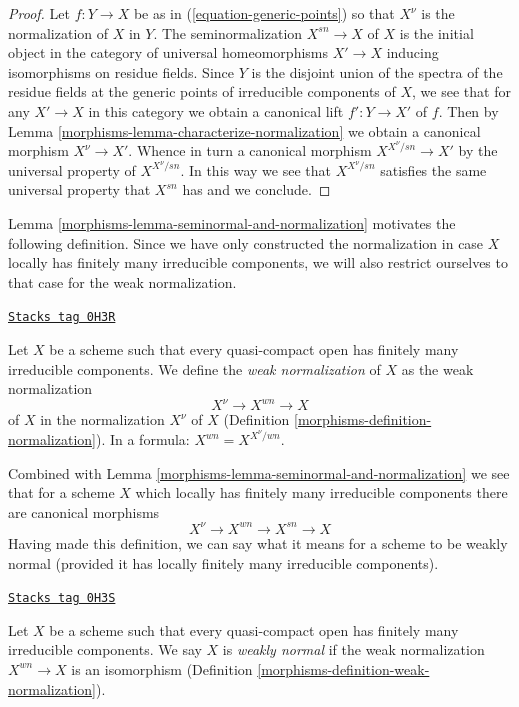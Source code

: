 \begin{proof}

Let $f : Y \to X$ be as in (\ref{equation-generic-points})
so that $X^\nu$ is the normalization of $X$ in $Y$.
The seminormalization $X^{sn} \to X$ of $X$ is the initial object in the
category of universal homeomorphisms $X' \to X$ inducing isomorphisms on
residue fields. Since $Y$ is the disjoint union of the spectra of the
residue fields at the generic points of irreducible components of $X$,
we see that for any $X' \to X$ in this category we obtain a canonical
lift $f' : Y \to X'$ of $f$. Then by
Lemma \ref{morphisms-lemma-characterize-normalization}
we obtain a canonical morphism $X^\nu \to X'$.
Whence in turn a canonical morphism $X^{X^\nu/sn} \to X'$
by the universal property of $X^{X^\nu/sn}$.
In this way we see that $X^{X^\nu/sn}$ satisfies the
same universal property that $X^{sn}$ has and we conclude.
\end{proof}

Lemma \ref{morphisms-lemma-seminormal-and-normalization} motivates the
following definition. Since we have only constructed the
normalization in case $X$ locally has finitely many irreducible components,
we will also restrict ourselves to that case for the weak normalization.

\begin{definition}
\label{morphisms-definition-weak-normalization}
\href{https://stacks.math.columbia.edu/tag/0H3R}{\texttt{Stacks tag 0H3R}}

Let $X$ be a scheme such that every quasi-compact open has
finitely many irreducible components. We define the
{\it weak normalization} of $X$ as the weak normalization
$$
X^\nu \longrightarrow X^{wn} \longrightarrow X
$$
of $X$ in the normalization $X^\nu$ of $X$
(Definition \ref{morphisms-definition-normalization}).
In a formula: $X^{wn} = X^{X^\nu/wn}$.
\end{definition}

Combined with Lemma \ref{morphisms-lemma-seminormal-and-normalization} we see that
for a scheme $X$ which locally has finitely many irreducible components
there are canonical morphisms
$$
X^\nu \to X^{wn} \to X^{sn} \to X
$$
Having made this definition, we can say what it means for a scheme
to be weakly normal (provided it has locally finitely many irreducible
components).

\begin{definition}
\label{morphisms-definition-weakly-normal}
\href{https://stacks.math.columbia.edu/tag/0H3S}{\texttt{Stacks tag 0H3S}}

Let $X$ be a scheme such that every quasi-compact open has
finitely many irreducible components. We say $X$ is {\it weakly normal}
if the weak normalization $X^{wn} \to X$ is an isomorphism
(Definition \ref{morphisms-definition-weak-normalization}).
\end{definition}

